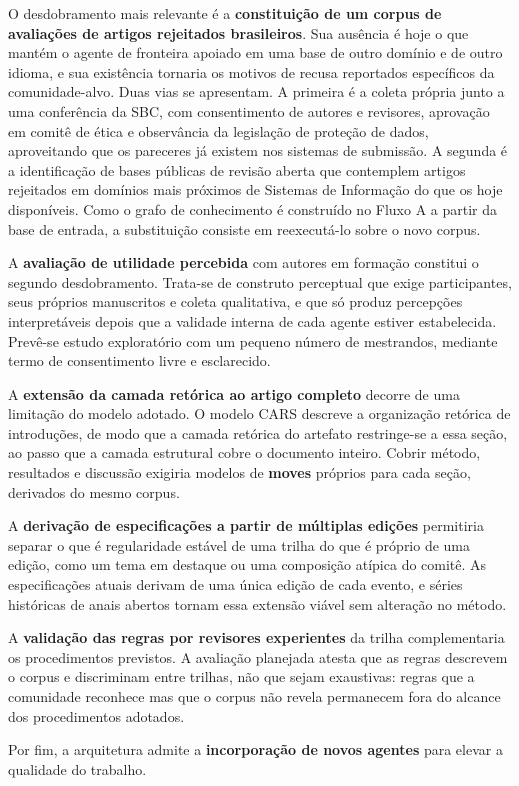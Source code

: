 O desdobramento mais relevante é a \textbf{constituição de um corpus de avaliações de artigos rejeitados brasileiros}. Sua ausência é hoje o que mantém o agente de fronteira apoiado em uma base de outro domínio e de outro idioma, e sua existência tornaria os motivos de recusa reportados específicos da comunidade-alvo. Duas vias se apresentam. A primeira é a coleta própria junto a uma conferência da SBC, com consentimento de autores e revisores, aprovação em comitê de ética e observância da legislação de proteção de dados, aproveitando que os pareceres já existem nos sistemas de submissão. A segunda é a identificação de bases públicas de revisão aberta que contemplem artigos rejeitados em domínios mais próximos de Sistemas de Informação do que os hoje disponíveis. Como o grafo de conhecimento é construído no Fluxo A a partir da base de entrada, a substituição consiste em reexecutá-lo sobre o novo corpus.

A \textbf{avaliação de utilidade percebida} com autores em formação constitui o segundo desdobramento. Trata-se de construto perceptual que exige participantes, seus próprios manuscritos e coleta qualitativa, e que só produz percepções interpretáveis depois que a validade interna de cada agente estiver estabelecida. Prevê-se estudo exploratório com um pequeno número de mestrandos, mediante termo de consentimento livre e esclarecido.

A \textbf{extensão da camada retórica ao artigo completo} decorre de uma limitação do modelo adotado. O modelo CARS descreve a organização retórica de introduções, de modo que a camada retórica do artefato restringe-se a essa seção, ao passo que a camada estrutural cobre o documento inteiro. Cobrir método, resultados e discussão exigiria modelos de \textbf{moves} próprios para cada seção, derivados do mesmo corpus.

A \textbf{derivação de especificações a partir de múltiplas edições} permitiria separar o que é regularidade estável de uma trilha do que é próprio de uma edição, como um tema em destaque ou uma composição atípica do comitê. As especificações atuais derivam de uma única edição de cada evento, e séries históricas de anais abertos tornam essa extensão viável sem alteração no método.

A \textbf{validação das regras por revisores experientes} da trilha complementaria os procedimentos previstos. A avaliação planejada atesta que as regras descrevem o corpus e discriminam entre trilhas, não que sejam exaustivas: regras que a comunidade reconhece mas que o corpus não revela permanecem fora do alcance dos procedimentos adotados.

Por fim, a arquitetura admite a \textbf{incorporação de novos agentes} para elevar a qualidade do trabalho.